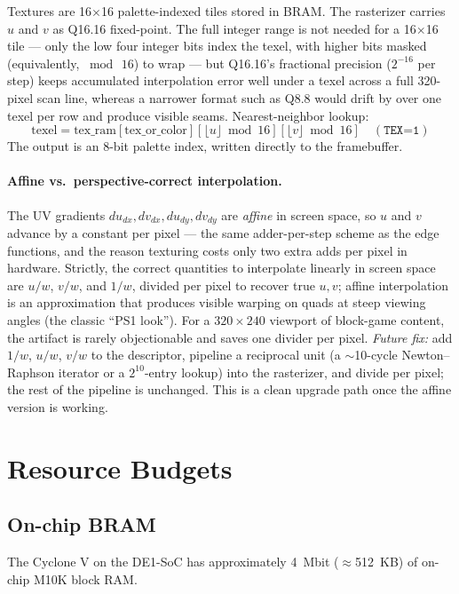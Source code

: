\documentclass[11pt]{article}
\begin{document}
Textures are 16$\times$16 palette-indexed tiles stored in BRAM. The rasterizer carries $u$ and $v$ as Q16.16 fixed-point. The full integer range is not needed for a 16$\times$16 tile --- only the low four integer bits index the texel, with higher bits masked (equivalently, $\bmod\,16$) to wrap --- but Q16.16's fractional precision ($2^{-16}$ per step) keeps accumulated interpolation error well under a texel across a full 320-pixel scan line, whereas a narrower format such as Q8.8 would drift by over one texel per row and produce visible seams. Nearest-neighbor lookup:
\[ \text{texel} = \text{tex\_ram}[\text{tex\_or\_color}][\lfloor u \rfloor \bmod 16][\lfloor v \rfloor \bmod 16] \quad (\texttt{TEX=1}) \]
The output is an 8-bit palette index, written directly to the framebuffer.

\paragraph{Affine vs.\ perspective-correct interpolation.} The UV gradients $du_{dx}, dv_{dx}, du_{dy}, dv_{dy}$ are \emph{affine} in screen space, so $u$ and $v$ advance by a constant per pixel --- the same adder-per-step scheme as the edge functions, and the reason texturing costs only two extra adds per pixel in hardware. Strictly, the correct quantities to interpolate linearly in screen space are $u/w$, $v/w$, and $1/w$, divided per pixel to recover true $u, v$; affine interpolation is an approximation that produces visible warping on quads at steep viewing angles (the classic ``PS1 look''). For a $320\times240$ viewport of block-game content, the artifact is rarely objectionable and saves one divider per pixel. \emph{Future fix:} add $1/w$, $u/w$, $v/w$ to the descriptor, pipeline a reciprocal unit (a $\sim$10-cycle Newton--Raphson iterator or a $2^{10}$-entry lookup) into the rasterizer, and divide per pixel; the rest of the pipeline is unchanged. This is a clean upgrade path once the affine version is working.

\section{Resource Budgets}

\subsection{On-chip BRAM}

The Cyclone V on the DE1-SoC has approximately 4~Mbit ($\approx$512~KB) of on-chip M10K block RAM.
\end{document}
